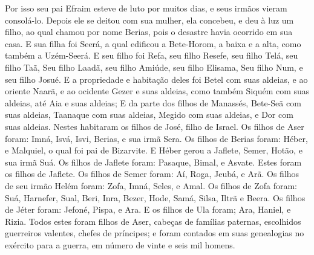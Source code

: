 {  Por isso seu pai Efraim esteve de luto por muitos dias, e seus irmãos vieram consolá-lo.
  Depois ele se deitou com sua mulher, ela concebeu, e deu à luz um filho, ao qual chamou por nome Berias, pois o desastre havia ocorrido em sua casa.
  E sua filha foi Seerá, a qual edificou a Bete-Horom, a baixa e a alta, como também a Uzém-Seerá.
  E seu filho foi Refa, seu filho Resefe, seu filho Telá, seu filho Taã,
  Seu filho Laadã, seu filho Amiúde, seu filho Elisama,
  Seu filho Num, e seu filho Josué.
  E a propriedade e habitação deles foi Betel com suas aldeias, e ao oriente Naarã, e ao ocidente Gezer e suas aldeias, como também Siquém com suas aldeias, até Aia e suas aldeias;
  E da parte dos filhos de Manassés, Bete-Seã com suas aldeias, Taanaque com suas aldeias, Megido com suas aldeias, e Dor com suas aldeias. Nestes {} habitaram os filhos de José, filho de Israel.
  Os filhos de Aser foram: Imná, Isvá, Isvi, Berias, e sua irmã Sera.
  Os filhos de Berias foram: Héber, e Malquiel, o qual foi pai de Bizarvite.
  E Héber gerou a Jaflete, Semer, Hotão, e sua irmã Suá.
  Os filhos de Jaflete foram: Pasaque, Bimal, e Asvate. Estes foram os filhos de Jaflete.
  Os filhos de Semer foram: Aí, Roga, Jeubá, e Arã.
  Os filhos de seu irmão Helém foram: Zofa, Imná, Seles, e Amal.
  Os filhos de Zofa foram: Suá, Harnefer, Sual, Beri, Inra,
  Bezer, Hode, Samá, Silsa, Iltrã e Beera.
  Os filhos de Jéter foram: Jefoné, Pispa, e Ara.
  E os filhos de Ula foram; Ara, Haniel, e Rizia.
  Todos estes foram filhos de Aser, cabeças de famílias paternas, escolhidos guerreiros valentes, chefes de príncipes; e foram contados em suas genealogias no exército para a guerra, em número de vinte e seis mil homens.
\par }

